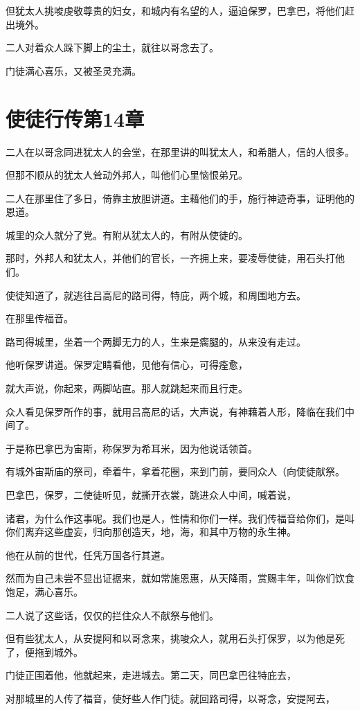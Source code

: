 \documentclass[12pt,oneside]{book}
\begin{document}
但犹太人挑唆虔敬尊贵的妇女，和城内有名望的人，逼迫保罗，巴拿巴，将他们赶出境外。

二人对着众人跺下脚上的尘土，就往以哥念去了。

门徒满心喜乐，又被圣灵充满。

\chapter{使徒行传第14章}
二人在以哥念同进犹太人的会堂，在那里讲的叫犹太人，和希腊人，信的人很多。

但那不顺从的犹太人耸动外邦人，叫他们心里恼恨弟兄。

二人在那里住了多日，倚靠主放胆讲道。主藉他们的手，施行神迹奇事，证明他的恩道。

城里的众人就分了党。有附从犹太人的，有附从使徒的。

那时，外邦人和犹太人，并他们的官长，一齐拥上来，要凌辱使徒，用石头打他们。

使徒知道了，就逃往吕高尼的路司得，特庇，两个城，和周围地方去。

在那里传福音。

路司得城里，坐着一个两脚无力的人，生来是瘸腿的，从来没有走过。

他听保罗讲道。保罗定睛看他，见他有信心，可得痊愈，

就大声说，你起来，两脚站直。那人就跳起来而且行走。

众人看见保罗所作的事，就用吕高尼的话，大声说，有神藉着人形，降临在我们中间了。

于是称巴拿巴为宙斯，称保罗为希耳米，因为他说话领首。

有城外宙斯庙的祭司，牵着牛，拿着花圈，来到门前，要同众人（向使徒献祭。

巴拿巴，保罗，二使徒听见，就撕开衣裳，跳进众人中间，喊着说，

诸君，为什么作这事呢。我们也是人，性情和你们一样。我们传福音给你们，是叫你们离弃这些虚妄，归向那创造天，地，海，和其中万物的永生神。

他在从前的世代，任凭万国各行其道。

然而为自己未尝不显出证据来，就如常施恩惠，从天降雨，赏赐丰年，叫你们饮食饱足，满心喜乐。

二人说了这些话，仅仅的拦住众人不献祭与他们。

但有些犹太人，从安提阿和以哥念来，挑唆众人，就用石头打保罗，以为他是死了，便拖到城外。

门徒正围着他，他就起来，走进城去。第二天，同巴拿巴往特庇去，

对那城里的人传了福音，使好些人作门徒。就回路司得，以哥念，安提阿去，
\end{document}
